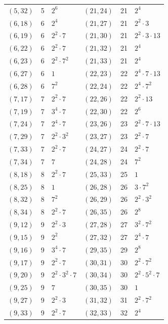 \documentclass[11pt]{article}
\begin{document}
\begin{longtable}{@{}lrl@{\qquad}lrl@{}}
$(5,32)$ & 5 & $2^{6}$ & $(21,24)$ & 21 & $2^{4}$\\
$(6,18)$ & 6 & $2^{4}$ & $(21,27)$ & 21 & $2^{2}\cdot 3$\\
$(6,19)$ & 6 & $2^{2}\cdot 7$ & $(21,30)$ & 21 & $2^{2}\cdot 3\cdot 13$\\
$(6,22)$ & 6 & $2^{2}\cdot 7$ & $(21,32)$ & 21 & $2^{4}$\\
$(6,23)$ & 6 & $2^{2}\cdot 7^{2}$ & $(21,33)$ & 21 & $2^{4}$\\
$(6,27)$ & 6 & $1$ & $(22,23)$ & 22 & $2^{4}\cdot 7\cdot 13$\\
$(6,28)$ & 6 & $7^{2}$ & $(22,24)$ & 22 & $2^{4}\cdot 7^{2}$\\
$(7,17)$ & 7 & $2^{2}\cdot 7$ & $(22,26)$ & 22 & $2^{2}\cdot 13$\\
$(7,19)$ & 7 & $3^{4}\cdot 7$ & $(22,30)$ & 22 & $2^{6}$\\
$(7,24)$ & 7 & $2^{4}\cdot 7$ & $(23,26)$ & 23 & $2^{2}\cdot 7\cdot 13$\\
$(7,29)$ & 7 & $2^{2}\cdot 3^{2}$ & $(23,27)$ & 23 & $2^{2}\cdot 7$\\
$(7,33)$ & 7 & $2^{2}\cdot 7$ & $(24,27)$ & 24 & $2^{2}\cdot 7$\\
$(7,34)$ & 7 & $7$ & $(24,28)$ & 24 & $7^{2}$\\
$(8,18)$ & 8 & $2^{2}\cdot 7$ & $(25,33)$ & 25 & $1$\\
$(8,25)$ & 8 & $1$ & $(26,28)$ & 26 & $3\cdot 7^{2}$\\
$(8,32)$ & 8 & $7^{2}$ & $(26,29)$ & 26 & $2^{2}\cdot 3^{2}$\\
$(8,34)$ & 8 & $2^{2}\cdot 7$ & $(26,35)$ & 26 & $2^{8}$\\
$(9,12)$ & 9 & $2^{2}\cdot 3$ & $(27,28)$ & 27 & $3^{2}\cdot 7^{2}$\\
$(9,15)$ & 9 & $2^{2}$ & $(27,32)$ & 27 & $2^{4}\cdot 7$\\
$(9,16)$ & 9 & $3^{4}\cdot 7$ & $(29,35)$ & 29 & $2^{8}$\\
$(9,17)$ & 9 & $2^{2}\cdot 7$ & $(30,31)$ & 30 & $2^{2}\cdot 7^{2}$\\
$(9,20)$ & 9 & $2^{2}\cdot 3^{2}\cdot 7$ & $(30,34)$ & 30 & $2^{2}\cdot 5^{2}\cdot 7$\\
$(9,25)$ & 9 & $7$ & $(30,35)$ & 30 & $1$\\
$(9,27)$ & 9 & $2^{2}\cdot 3$ & $(31,32)$ & 31 & $2^{2}\cdot 7^{2}$\\
$(9,33)$ & 9 & $2^{2}\cdot 7$ & $(32,33)$ & 32 & $2^{4}$\\
\end{longtable}
\endgroup
\end{document}

